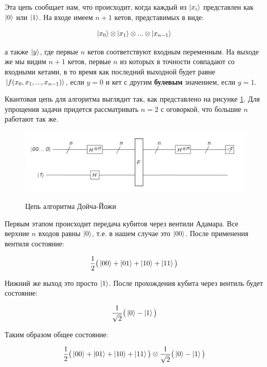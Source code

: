 \documentclass[a4paper, 12pt]{article}
\begin{document}
Эта цепь сообщает нам, что происходит, когда каждый из $\ket{x_i}$ представлен как $\ket{0}$ или $\ket{1}$. На входе имеем $n+1$ кетов, представимых в виде:

\begin{equation}
	\ket{x_0} \otimes \ket{x_1} \otimes ...  \otimes \ket{x_{n-1}}
\end{equation}

а также $\ket{y}$, где первые $n$ кетов соответствуют входным переменным. На выходе же мы видим $n+1$ кетов, первые $n$ из которых в точности совпадают со входными кетами, в то время как последний выходной будет равне $\ket{f(x_0, x_1, ..., x_{n-1})}$, если $y=0$ и кет с другим \textbf{булевым} значением, если $y=1$.

Квантовая цепь для алгоритма выглядит так, как представлено на рисунке \ref{Doice-Jozhe}. Для упрощения задачи придется рассматривать $n=2$ с оговоркой, что большие $n$ работают так же.

\begin{figure}[H]
	\centering
	\includegraphics[width=0.8\linewidth]{Doice-Jozhe}
	\label{Doice-Jozhe}
	\caption{Цепь алгоритма Дойча-Йожи}
\end{figure}

Первым этапом происходит передача кубитов через вентили Адамара. Все верхние $n$ входов равны $\ket{0}$, т.е. в нашем случае это $\ket{00}$. После применения вентиля состояние:

\begin{equation}
	\frac{1}{2}\big(\ket{00} + \ket{01} + \ket{10} + \ket{11}\big)
\end{equation}

Нижний же выход это просто $\ket{1}$. После прохождения кубита через вентиль будет состояние:

\begin{equation}
	\frac{1}{\sqrt{2}}\big(\ket{0} - \ket{1}\big)
\end{equation}

Таким образом общее состояние:

\begin{equation}
	\frac{1}{2} \big(\ket{00} + \ket{01} + \ket{10} + \ket{11}\big) \otimes \frac{1}{\sqrt{2}}\big(\ket{0} - \ket{1}\big)
\end{equation}
\end{document}
